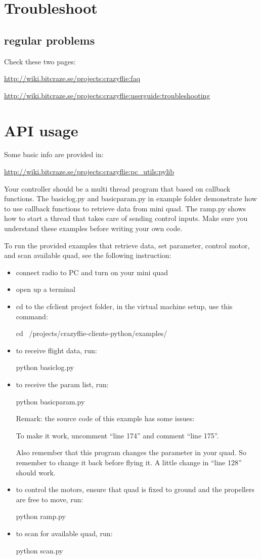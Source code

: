 \documentclass[11pt]{article}
\begin{document}
\section{Troubleshoot}
\subsection{regular problems}
Check these two pages:

\url{http://wiki.bitcraze.se/projects:crazyflie:faq}

\url{http://wiki.bitcraze.se/projects:crazyflie:userguide:troubleshooting}

\section{API usage}
Some basic info are provided in: 

\url{http://wiki.bitcraze.se/projects:crazyflie:pc\_utils:pylib}

Your controller should be a multi thread program that based on callback functions. The basiclog.py and basicparam.py in example folder demonstrate how to use callback functions to retrieve data from mini quad. The ramp.py shows how to start a thread that takes care of sending control inputs. Make sure you understand these examples before writing your own code.

To run the provided examples that retrieve data, set parameter, control motor, and scan available quad, see the following instruction:

\begin{itemize}
\item connect radio to PC and turn on your mini quad
\item open up a terminal
\item cd to the cfclient project folder, in the virtual machine setup, use this command:

	cd ~/projects/crazyflie-clients-python/examples/
\item to receive flight data, run:

	python basiclog.py
\item to receive the param list, run:

	python basicparam.py
	
	Remark: the source code of this example has some issues:
	
	To make it work, uncomment ``line 174'' and comment ``line 175''.
	
	Also remember that this program changes the parameter in your quad. So remember to change it back before flying it. A little change in ``line 128'' should work.
	
	
\item to control the motors, ensure that quad is fixed to ground and the propellers are free to move, run:
	
	python ramp.py
\item to scan for available quad, run:

	python scan.py
\end{itemize}
\end{document}
